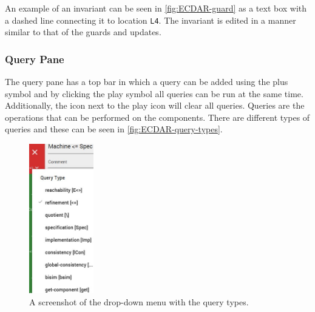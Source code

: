 An example of an invariant can be seen in \autoref{fig:ECDAR-guard} as a text box with a dashed line connecting it to location \texttt{L4}. The invariant is edited in a manner similar to that of the guards and updates. 


\subsubsection{Query Pane} \label{subsub:query-pane}
The query pane has a top bar in which a query can be added using the plus symbol and by clicking the play symbol all queries can be run at the same time. Additionally, the icon next to the play icon will clear all queries. Queries are the operations that can be performed on the components. There are different types of queries and these can be seen in \autoref{fig:ECDAR-query-types}. 

\begin{figure}[H]
    \centering
    \includegraphics[width=0.25\textwidth]{common/figures/check-type.jpg}
    \caption{A screenshot of the drop-down menu with the query types.}
    \label{fig:ECDAR-query-types}
\end{figure}


